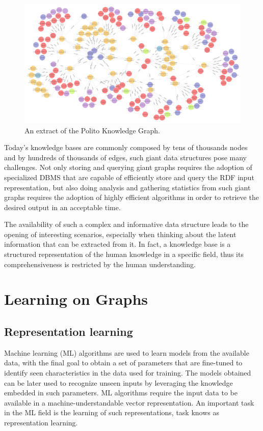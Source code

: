 \documentclass[%
    corpo=13.5pt,
    twoside,
    oldstyle,
    tipotesi=magistrale,
    greek,
    evenboxes
]{toptesi}
\begin{document}
\begin{figure}[h]
\centering
\includegraphics[scale=0.4]{img/geranium-knowledge-base-example.png}
\caption{An extract of the Polito Knowledge Graph.}
\label{fig:geranium-knowledge-base-example}
\end{figure}


Today's knowledge bases are commonly composed by tens of
thousands nodes and by hundreds of thousands of edges, such giant data
structures pose many challenges.
Not only storing and querying giant graphs requires the adoption of
specialized DBMS that are capable of efficiently store and query the RDF
input representation, but also doing analysis and gathering statistics from
such giant graphs requires the adoption of highly efficient algorithms in
order to retrieve the desired output in an acceptable time.

The availability of such a complex and informative data structure leads
to the opening of interesting scenarios, especially when thinking about
the latent information that can be extracted from it. In
fact, a knowledge base is a structured representation of the
human knowledge in a specific field, thus its comprehensiveness is restricted
by the human understanding.


\section{Learning on Graphs}

\subsection{Representation learning}

Machine learning (ML) algorithms are used to learn models from the
available data, with the final goal to obtain a set of parameters
that are fine-tuned to identify seen characteristics in the data
used for training. The models obtained can be later used to
recognize unseen inputs by leveraging the knowledge embedded
in such parameters.
ML algorithms require the input data to be available in a
machine-understandable vector representation. An important task
in the ML field is the learning of such representations, task knows
as representation learning.
\end{document}
